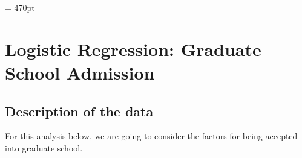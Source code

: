 
\textwidth = 470pt




\section{Logistic Regression: Graduate School Admission}
\subsection{Description of the data}
For this analysis below, we are going to consider the factors for being accepted into graduate school.

